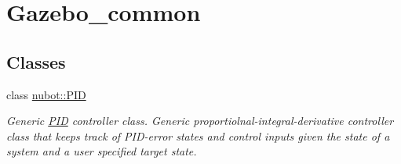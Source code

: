 \hypertarget{group__gazebo__common}{\section{Gazebo\-\_\-common}
\label{group__gazebo__common}
}
\subsection*{Classes}
\begin{DoxyCompactItemize}
\item 
class \hyperlink{classnubot_1_1PID}{nubot\-::\-P\-I\-D}
\begin{DoxyCompactList}\small\item\em Generic \hyperlink{classnubot_1_1PID}{P\-I\-D} controller class. Generic proportiolnal-\/integral-\/derivative controller class that keeps track of P\-I\-D-\/error states and control inputs given the state of a system and a user specified target state. \end{DoxyCompactList}\end{DoxyCompactItemize}
